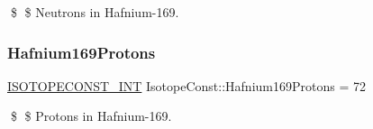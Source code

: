 \$ \$ Neutrons in Hafnium-\/169. \mbox{\label{group___isotope_const-_hafnium-_hf169_ga4b517e4e30ddd45c4fc50b9ab3625c45}} 
\subsubsection{\texorpdfstring{Hafnium169\+Protons}{Hafnium169Protons}}
{\footnotesize\ttfamily \mbox{\hyperlink{group___isotope_const-_macros_ga5f18360b3e99483a35c32d789e62621c}{I\+S\+O\+T\+O\+P\+E\+C\+O\+N\+S\+T\+\_\+\+I\+NT}} Isotope\+Const\+::\+Hafnium169\+Protons = 72}

\$ \$ Protons in Hafnium-\/169. 